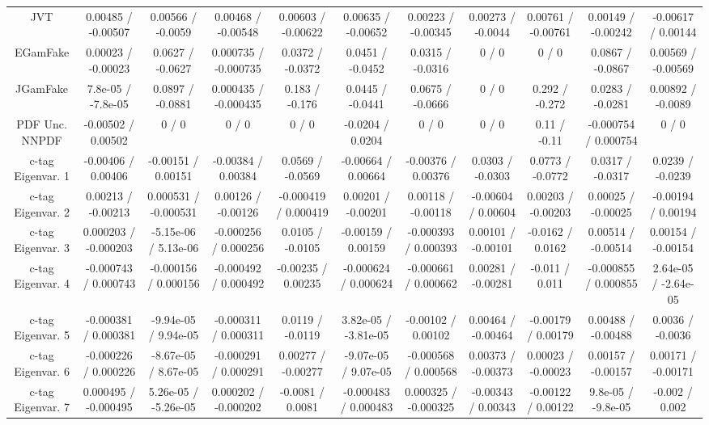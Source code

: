 \begin{table}[htbp]
\begin{center}
\begin{tabular}{|c|c|c|c|c|c|c|c|c|c|c|}
  JVT & 0.00485 / -0.00507 & 0.00566 / -0.0059 & 0.00468 / -0.00548 & 0.00603 / -0.00622 & 0.00635 / -0.00652 & 0.00223 / -0.00345 & 0.00273 / -0.0044 & 0.00761 / -0.00761 & 0.00149 / -0.00242 & -0.00617 / 0.00144 \\ 
  EGamFake & 0.00023 / -0.00023 & 0.0627 / -0.0627 & 0.000735 / -0.000735 & 0.0372 / -0.0372 & 0.0451 / -0.0452 & 0.0315 / -0.0316 & 0 / 0 & 0 / 0 & 0.0867 / -0.0867 & 0.00569 / -0.00569 \\ 
  JGamFake & 7.8e-05 / -7.8e-05 & 0.0897 / -0.0881 & 0.000435 / -0.000435 & 0.183 / -0.176 & 0.0445 / -0.0441 & 0.0675 / -0.0666 & 0 / 0 & 0.292 / -0.272 & 0.0283 / -0.0281 & 0.00892 / -0.0089 \\ 
  PDF Unc. NNPDF & -0.00502 / 0.00502 & 0 / 0 & 0 / 0 & 0 / 0 & -0.0204 / 0.0204 & 0 / 0 & 0 / 0 & 0.11 / -0.11 & -0.000754 / 0.000754 & 0 / 0 \\ 
  c-tag Eigenvar. 1 & -0.00406 / 0.00406 & -0.00151 / 0.00151 & -0.00384 / 0.00384 & 0.0569 / -0.0569 & -0.00664 / 0.00664 & -0.00376 / 0.00376 & 0.0303 / -0.0303 & 0.0773 / -0.0772 & 0.0317 / -0.0317 & 0.0239 / -0.0239 \\ 
  c-tag Eigenvar. 2 & 0.00213 / -0.00213 & 0.000531 / -0.000531 & 0.00126 / -0.00126 & -0.000419 / 0.000419 & 0.00201 / -0.00201 & 0.00118 / -0.00118 & -0.00604 / 0.00604 & 0.00203 / -0.00203 & 0.00025 / -0.00025 & -0.00194 / 0.00194 \\ 
  c-tag Eigenvar. 3 & 0.000203 / -0.000203 & -5.15e-06 / 5.13e-06 & -0.000256 / 0.000256 & 0.0105 / -0.0105 & -0.00159 / 0.00159 & -0.000393 / 0.000393 & 0.00101 / -0.00101 & -0.0162 / 0.0162 & 0.00514 / -0.00514 & 0.00154 / -0.00154 \\ 
  c-tag Eigenvar. 4 & -0.000743 / 0.000743 & -0.000156 / 0.000156 & -0.000492 / 0.000492 & -0.00235 / 0.00235 & -0.000624 / 0.000624 & -0.000661 / 0.000662 & 0.00281 / -0.00281 & -0.011 / 0.011 & -0.000855 / 0.000855 & 2.64e-05 / -2.64e-05 \\ 
  c-tag Eigenvar. 5 & -0.000381 / 0.000381 & -9.94e-05 / 9.94e-05 & -0.000311 / 0.000311 & 0.0119 / -0.0119 & 3.82e-05 / -3.81e-05 & -0.00102 / 0.00102 & 0.00464 / -0.00464 & -0.00179 / 0.00179 & 0.00488 / -0.00488 & 0.0036 / -0.0036 \\ 
  c-tag Eigenvar. 6 & -0.000226 / 0.000226 & -8.67e-05 / 8.67e-05 & -0.000291 / 0.000291 & 0.00277 / -0.00277 & -9.07e-05 / 9.07e-05 & -0.000568 / 0.000568 & 0.00373 / -0.00373 & 0.00023 / -0.00023 & 0.00157 / -0.00157 & 0.00171 / -0.00171 \\ 
  c-tag Eigenvar. 7 & 0.000495 / -0.000495 & 5.26e-05 / -5.26e-05 & 0.000202 / -0.000202 & -0.0081 / 0.0081 & -0.000483 / 0.000483 & 0.000325 / -0.000325 & -0.00343 / 0.00343 & -0.00122 / 0.00122 & 9.8e-05 / -9.8e-05 & -0.002 / 0.002 \\ 

\end{tabular}
\end{center}
\end{table}
